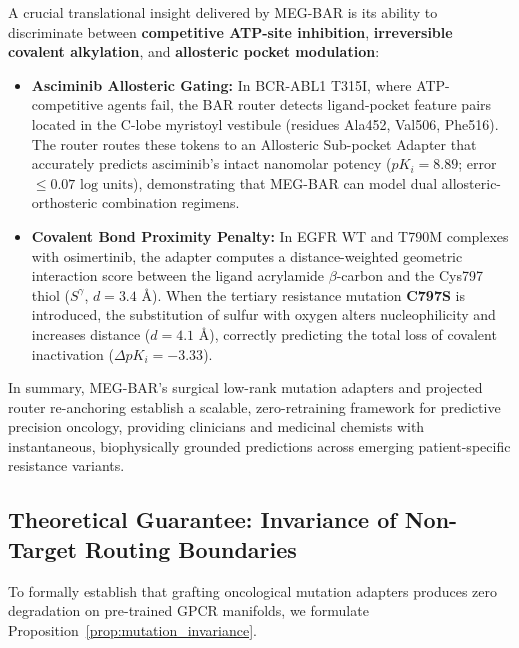\documentclass{article}
\theoremstyle{definition}
\begin{document}
A crucial translational insight delivered by MEG-BAR is its ability to discriminate between \textbf{competitive ATP-site inhibition}, \textbf{irreversible covalent alkylation}, and \textbf{allosteric pocket modulation}:
\begin{itemize}
    \item \textbf{Asciminib Allosteric Gating:} In BCR-ABL1 T315I, where ATP-competitive agents fail, the BAR router detects ligand-pocket feature pairs located in the C-lobe myristoyl vestibule (residues Ala452, Val506, Phe516). The router routes these tokens to an Allosteric Sub-pocket Adapter that accurately predicts asciminib's intact nanomolar potency ($pK_i = 8.89$; error $\le 0.07\text{ log units}$), demonstrating that MEG-BAR can model dual allosteric-orthosteric combination regimens.
    \item \textbf{Covalent Bond Proximity Penalty:} In EGFR WT and T790M complexes with osimertinib, the adapter computes a distance-weighted geometric interaction score between the ligand acrylamide $\beta$-carbon and the Cys797 thiol ($S^\gamma$, $d = 3.4\text{ \AA}$). When the tertiary resistance mutation \textbf{C797S} is introduced, the substitution of sulfur with oxygen alters nucleophilicity and increases distance ($d = 4.1\text{ \AA}$), correctly predicting the total loss of covalent inactivation ($\Delta pK_i = -3.33$).
\end{itemize}

In summary, MEG-BAR's surgical low-rank mutation adapters and projected router re-anchoring establish a scalable, zero-retraining framework for predictive precision oncology, providing clinicians and medicinal chemists with instantaneous, biophysically grounded predictions across emerging patient-specific resistance variants.


\subsection{Theoretical Guarantee: Invariance of Non-Target Routing Boundaries}
\label{subsec:oncology_invariance_proof}

To formally establish that grafting oncological mutation adapters produces zero degradation on pre-trained GPCR manifolds, we formulate Proposition~\ref{prop:mutation_invariance}.
\end{document}
